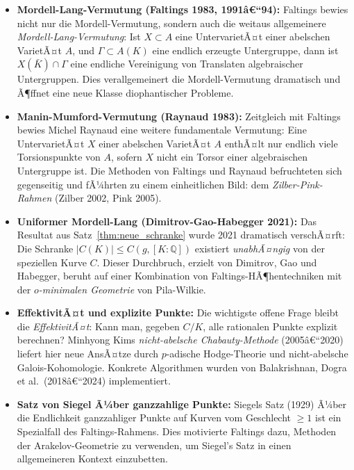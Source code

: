 ﻿\documentclass[12pt,a4paper]{article}
\theoremstyle{plain}
\theoremstyle{definition}
\theoremstyle{remark}
\newcommand{\Q}{\mathbb{Q}}
\begin{document}
\begin{itemize}[leftmargin=2em,itemsep=4pt]
  \item \textbf{Mordell-Lang-Vermutung (Faltings 1983, 1991â€“94):}
    Faltings bewies nicht nur die Mordell-Vermutung, sondern auch die weitaus allgemeinere
    \emph{Mordell-Lang-Vermutung}: Ist $X \subset A$ eine UntervarietÃ¤t einer abelschen
    VarietÃ¤t $A$, und $\Gamma \subset A(K)$ eine endlich erzeugte Untergruppe,
    dann ist $X(\bar K) \cap \Gamma$ eine endliche Vereinigung von Translaten algebraischer
    Untergruppen. Dies verallgemeinert die Mordell-Vermutung dramatisch und Ã¶ffnet
    eine neue Klasse diophantischer Probleme.

  \item \textbf{Manin-Mumford-Vermutung (Raynaud 1983):}
    Zeitgleich mit Faltings bewies Michel Raynaud eine weitere fundamentale Vermutung:
    Eine UntervarietÃ¤t $X$ einer abelschen VarietÃ¤t $A$ enthÃ¤lt nur endlich viele
    Torsionspunkte von $A$, sofern $X$ nicht ein Torsor einer algebraischen Untergruppe ist.
    Die Methoden von Faltings und Raynaud befruchteten sich gegenseitig und fÃ¼hrten
    zu einem einheitlichen Bild: dem \emph{Zilber-Pink-Rahmen} (Zilber 2002, Pink 2005).

  \item \textbf{Uniformer Mordell-Lang (Dimitrov-Gao-Habegger 2021):}
    Das Resultat aus Satz~\ref{thm:neue_schranke} wurde 2021 dramatisch verschÃ¤rft:
    Die Schranke $|C(K)| \leq C(g, [K:\Q])$ existiert \emph{unabhÃ¤ngig} von der
    speziellen Kurve $C$. Dieser Durchbruch, erzielt von Dimitrov, Gao und Habegger,
    beruht auf einer Kombination von Faltings-HÃ¶hentechniken mit der
    \emph{$o$-minimalen Geometrie} von Pila-Wilkie.

  \item \textbf{EffektivitÃ¤t und explizite Punkte:}
    Die wichtigste offene Frage bleibt die \emph{EffektivitÃ¤t}: Kann man, gegeben $C/K$,
    alle rationalen Punkte explizit berechnen? Minhyong Kims \emph{nicht-abelsche
    Chabauty-Methode} (2005â€“2020) liefert hier neue AnsÃ¤tze durch
    $p$-adische Hodge-Theorie und nicht-abelsche Galois-Kohomologie.
    Konkrete Algorithmen wurden von Balakrishnan, Dogra et al.\ (2018â€“2024) implementiert.

  \item \textbf{Satz von Siegel Ã¼ber ganzzahlige Punkte:}
    Siegels Satz (1929) Ã¼ber die Endlichkeit ganzzahliger Punkte auf Kurven vom Geschlecht
    $\geq 1$ ist ein Spezialfall des Faltings-Rahmens. Dies motivierte Faltings dazu,
    Methoden der Arakelov-Geometrie zu verwenden, um Siegel's Satz in einen allgemeineren
    Kontext einzubetten.
\end{itemize}
\end{document}

